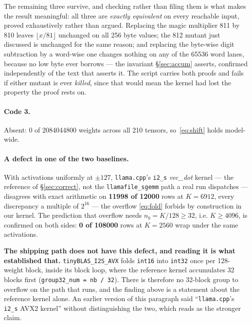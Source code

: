 \documentclass[11pt,a4paper]{article}
\newcommand{\code}[1]{\texttt{#1}}
\begin{document}
The remaining three survive, and checking rather than filing them is what makes
the result meaningful: all three are \emph{exactly equivalent} on every
reachable input, proved exhaustively rather than argued. Replacing the magic multiplier
811 by 810 leaves $\lfloor x/81 \rfloor$ unchanged on all 256 byte values;
the 812 mutant just discussed is unchanged for the same reason; and replacing the
byte-wise digit subtraction by a word-wise one changes nothing on any of the
\num{65536} word lanes, because no low byte ever borrows --- the invariant
\S\ref{sec:accum} asserts, confirmed independently of the text that asserts it. The script carries both proofs and fails if either mutant is ever
\emph{killed}, since that would mean the kernel had lost the property the proof
rests on.

\paragraph{Code 3.} Absent: 0 of \num{2084044800} weights across all 210
tensors, so~\eqref{eq:shift} holds model-wide.

\paragraph{A defect in one of the two baselines.} With activations uniformly at
$\pm 127$, \code{llama.cpp}'s \code{i2\_s} \emph{vec\_dot} kernel --- the
reference of \S\ref{sec:correct}, not the \code{llamafile\_sgemm} path a real
run dispatches --- disagrees with exact arithmetic on
\textbf{\num{11998} of \num{12000}} rows at $K = 6912$, every discrepancy a
multiple of $2^{16}$ --- the overflow \eqref{eq:fold} forbids by construction in
our kernel. The prediction that overflow needs $n_b = K/128 \ge 32$, i.e.
$K \ge 4096$, is confirmed on both sides: \textbf{0 of \num{108000}} rows at
$K = 2560$ wrap under the same activations.

\textbf{The shipping path does not have this defect, and reading it is what
established that.} \code{tinyBLAS\_I2S\_AVX} folds \code{int16} into
\code{int32} once per 128-weight block, inside its block loop, where the
reference kernel accumulates 32 blocks first (\code{group32\_num = nb / 32}).
There is therefore no 32-block group to overflow on the path that runs, and the
finding above is a statement about the reference kernel alone. An earlier
version of this paragraph said ``\code{llama.cpp}'s \code{i2\_s} AVX2 kernel''
without distinguishing the two, which reads as the stronger claim.
\end{document}

